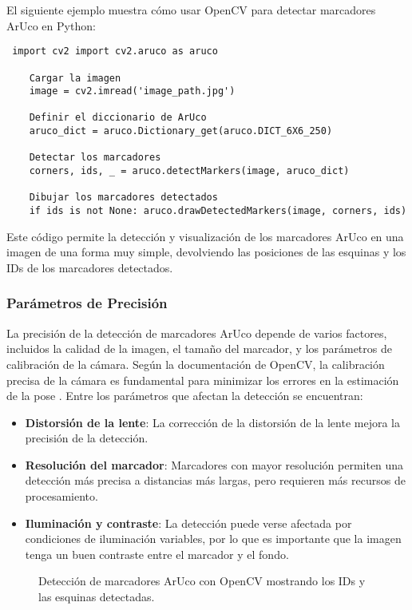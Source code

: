     El siguiente ejemplo muestra cómo usar OpenCV para detectar marcadores ArUco en Python:

    \begin{verbatim} import cv2 import cv2.aruco as aruco

    Cargar la imagen
    image = cv2.imread('image_path.jpg')

    Definir el diccionario de ArUco
    aruco_dict = aruco.Dictionary_get(aruco.DICT_6X6_250)

    Detectar los marcadores
    corners, ids, _ = aruco.detectMarkers(image, aruco_dict)

    Dibujar los marcadores detectados
    if ids is not None: aruco.drawDetectedMarkers(image, corners, ids) \end{verbatim}

    Este código permite la detección y visualización de los marcadores ArUco en una imagen de una forma muy simple, devolviendo las posiciones de las esquinas y los IDs de los marcadores detectados.

    \subsubsection{Parámetros de Precisión}

    La precisión de la detección de marcadores ArUco depende de varios factores, incluidos la calidad de la imagen, el tamaño del marcador, y los parámetros de calibración de la cámara. Según la documentación de OpenCV, la calibración precisa de la cámara es fundamental para minimizar los errores en la estimación de la pose \cite{opencv_docs_aruco}. Entre los parámetros que afectan la detección se encuentran:

    \begin{itemize} \item \textbf{Distorsión de la lente}: La corrección de la distorsión de la lente mejora la precisión de la detección. \item \textbf{Resolución del marcador}: Marcadores con mayor resolución permiten una detección más precisa a distancias más largas, pero requieren más recursos de procesamiento. \item \textbf{Iluminación y contraste}: La detección puede verse afectada por condiciones de iluminación variables, por lo que es importante que la imagen tenga un buen contraste entre el marcador y el fondo. \end{itemize}

    \begin{figure}[h!] 
        \centering 
        \caption{Detección de marcadores ArUco con OpenCV mostrando los IDs y las esquinas detectadas.} 
        \label{fig} 
    \end{figure}





